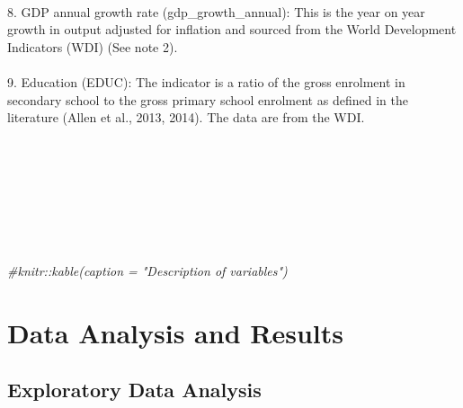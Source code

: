 \documentclass[a4paper,nobind]{templates/ociamthesis}
\newenvironment{Shaded}{\begin{snugshade}}{\end{snugshade}}
\newcommand{\CommentTok}[1]{\textcolor[rgb]{0.56,0.35,0.01}{\textit{#1}}}
\renewenvironment{Shaded}
{
  \vspace{10pt}%
  \begin{snugshade}%
}{%
  \end{snugshade}%
  \vspace{8pt}%
}
\begin{document}
\begin{table}
\begin{tabu}
\\
8. GDP annual growth rate (gdp\_growth\_annual): This is the year on year growth in output adjusted for inflation and sourced from the World Development Indicators (WDI) (See note 2).\\
\addlinespace
\\
9. Education (EDUC): The indicator is a ratio of the gross enrolment in secondary school to the gross primary school enrolment as defined in the literature (Allen et al., 2013, 2014). The data are from the WDI.\\
\\
\bottomrule
{}\\
\\
\\
\\
\\
\\
\end{tabu}
\end{table}

\begin{Shaded}
\begin{Highlighting}[]
  \CommentTok{\#knitr::kable(caption = "Description of variables")}
\end{Highlighting}
\end{Shaded}

\hypertarget{data-analysis-and-results}{%
\section{Data Analysis and Results}\label{data-analysis-and-results}}

\hypertarget{exploratory-data-analysis}{%
\subsection{Exploratory Data Analysis}\label{exploratory-data-analysis}}
\end{document}
